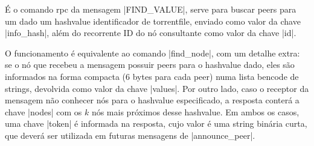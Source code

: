 

É o comando \gls*{rpc} da mensagem \bverb|FIND\_VALUE|, serve para buscar \glspl*{peer}
para um dado um \gls*{hashvalue} identificador de \gls*{torrentfile}, enviado como
valor da chave \bverb|info\_hash|, além do recorrente ID do nó consultante como valor
da chave \bverb|id|.

O funcionamento é equivalente ao comando \bverb|find\_node|, com um detalhe extra: se o
nó que recebeu a mensagem possuir \glspl*{peer} para o \gls*{hashvalue} dado, eles são
informados na forma compacta (6 bytes para cada \gls*{peer}) numa lista \gls*{bencode}
de \glspl*{string}, devolvida como valor da chave \bverb|values|. Por outro lado, caso o
receptor da mensagem não conhecer nós para o \gls*{hashvalue} especificado, a resposta
conterá a chave \bverb|nodes| com os $k$ nós mais próximos desse \gls*{hashvalue}. Em
ambos os casos, uma chave \bverb|token| é informada na resposta, cujo valor é uma
\gls*{string} binária curta, que deverá ser utilizada em futuras mensagens de
\bverb|announce\_peer|.

